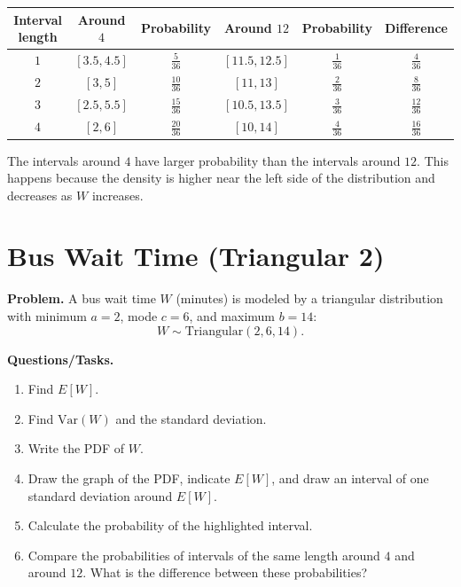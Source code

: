 \begin{enumerate}[label=\textbf{\alph*)}]
	
	\begin{center}
		\begin{tabular}{c c c c c c}
			\hline
			Interval length & Around \(4\) & Probability & Around \(12\) & Probability & Difference \\
			\hline
			\(1\) & \([3.5,4.5]\) & \(\frac{5}{36}\) & \([11.5,12.5]\) & \(\frac{1}{36}\) & \(\frac{4}{36}\) \\
			\(2\) & \([3,5]\) & \(\frac{10}{36}\) & \([11,13]\) & \(\frac{2}{36}\) & \(\frac{8}{36}\) \\
			\(3\) & \([2.5,5.5]\) & \(\frac{15}{36}\) & \([10.5,13.5]\) & \(\frac{3}{36}\) & \(\frac{12}{36}\) \\
			\(4\) & \([2,6]\) & \(\frac{20}{36}\) & \([10,14]\) & \(\frac{4}{36}\) & \(\frac{16}{36}\) \\
			\hline
		\end{tabular}
	\end{center}
	
	The intervals around \(4\) have larger probability than the intervals around \(12\). This happens because the density is higher near the left side of the distribution and decreases as \(W\) increases.
	
\end{enumerate}

\section{Bus Wait Time (Triangular 2)}

\textbf{Problem.}
A bus wait time \(W\) (minutes) is modeled by a triangular distribution with minimum \(a=2\), mode \(c=6\), and maximum \(b=14\):
\[
W\sim \text{Triangular}(2,6,14).
\]

\textbf{Questions/Tasks.}
\begin{enumerate}[label=\textbf{\alph*)}]
	\item Find \(E[W]\).
	\item Find \(\mathrm{Var}(W)\) and the standard deviation.
	\item Write the PDF of \(W\).
	\item Draw the graph of the PDF, indicate \(E[W]\), and draw an interval of one standard deviation around \(E[W]\).
	\item Calculate the probability of the highlighted interval.
	\item Compare the probabilities of intervals of the same length around \(4\) and around \(12\). What is the difference between these probabilities?
\end{enumerate}

